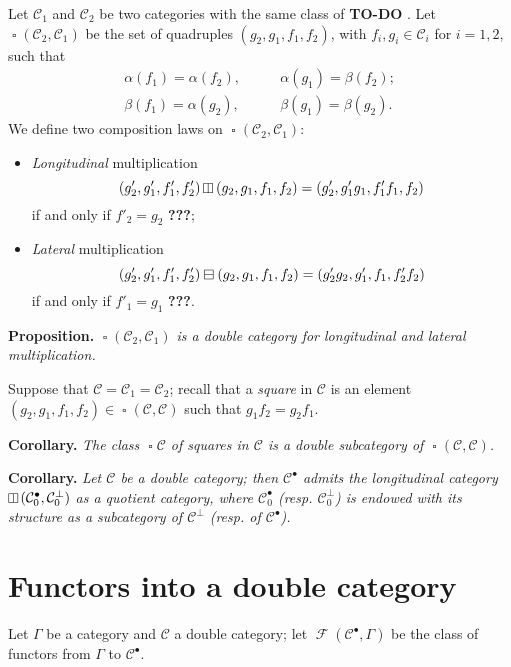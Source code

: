 \documentclass{article}
\newenvironment{itenv}[1]
  {\phantomsection\par\medskip\noindent\textbf{#1.}\itshape}
  {\par\medskip}
\newcommand{\todo}{{\color{purple}\textbf{TO-DO }}}
\newcommand{\unsure}[1]{{\color{purple}\textbf{#1}}}
\newcommand{\CC}{\mathcal{C}}
\DeclareMathOperator{\sq}{\square}
\DeclareMathOperator{\vsq}{\raisebox{-.1em}{\rotatebox{90}{$\boxminus$}\,}}
\newcommand{\vmult}{\mathbin{\raisebox{-.1em}{\rotatebox{90}{$\boxminus$}}}}
\newcommand{\hmult}{\mathbin{\raisebox{-.05em}{$\boxminus$}}}
\DeclareMathOperator{\FF}{\mathcal{F}}
\begin{document}
Let $\CC_1$ and $\CC_2$ be two categories with the same class of \todo.
Let $\sq(\CC_2,\CC_1)$ be the set of quadruples $(g_2,g_1,f_1,f_2)$, with $f_i,g_i\in\CC_i$ for $i=1,2$, such that
\[
  \begin{aligned}
    \alpha(f_1)
    = \alpha(f_2),
    &\qquad
    \alpha(g_1)
    = \beta(f_2);
  \\\beta(f_1)
    = \alpha(g_2),
    &\qquad
    \beta(g_1)
    = \beta(g_2).
  \end{aligned}
\]
We define two composition laws on $\sq(\CC_2,\CC_1)$:
\begin{itemize}
  \item \emph{Longitudinal} multiplication
    \[
      (g'_2,g'_1,f'_1,f'_2)\vmult(g_2,g_1,f_1,f_2)
      = (g'_2,g'_1g_1,f'_1f_1,f_2)
    \]
    if and only if $f'_2=g_2$ \unsure{???};
  \item \emph{Lateral} multiplication
    \[
      (g'_2,g'_1,f'_1,f'_2)\hmult(g_2,g_1,f_1,f_2)
      = (g'_2g_2,g'_1,f_1,f'_2f_2)
    \]
    if and only if $f'_1=g_1$ \unsure{???}.
\end{itemize}

\begin{itenv}{Proposition}
  $\sq(\CC_2,\CC_1)$ is a double category for longitudinal and lateral multiplication.
\end{itenv}

Suppose that $\CC=\CC_1=\CC_2$;
recall that a \emph{square} in $\CC$ is an element $(g_2,g_1,f_1,f_2)\in\sq(\CC,\CC)$ such that $g_1f_2=g_2f_1$.

\begin{itenv}{Corollary}
  The class $\sq\CC$ of squares in $\CC$ is a double subcategory of $\sq(\CC,\CC)$.
\end{itenv}

\begin{itenv}{Corollary}
  Let $\CC$ be a double category;
  then $\CC^\bullet$ admits the longitudinal category $\vsq(\CC_0^\bullet,\CC_0^\perp)$ as a quotient category, where $\CC_0^\bullet$ (resp. $\CC_0^\perp$) is endowed with its structure as a subcategory of $\CC^\perp$ (resp. of $\CC^\bullet$).
\end{itenv}


\section{Functors into a double category}

Let $\Gamma$ be a category and $\CC$ a double category;
let $\FF(\CC^\bullet,\Gamma)$ be the class of functors from $\Gamma$ to $\CC^\bullet$.
\end{document}

